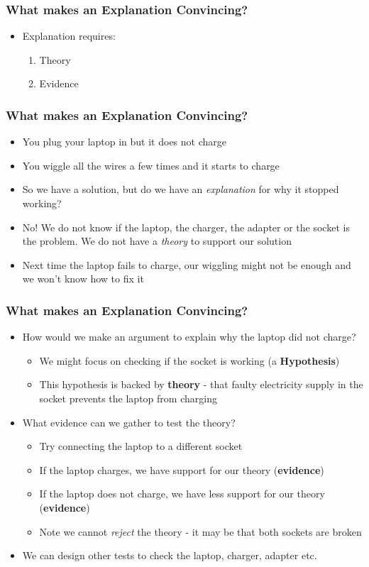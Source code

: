 \documentclass[xcolor=x11names,compress]{beamer}\usepackage[]{graphicx}\usepackage[]{color}
\renewcommand{\(}{\begin{columns}}
\renewcommand{\)}{\end{columns}}
\newcommand{\<}[1]{\begin{column}{#1}}
\renewcommand{\>}{\end{column}}
\begin{document}
\begin{frame}
\frametitle{What makes an Explanation Convincing?}
\begin{itemize}
\item  Explanation requires:
\begin{enumerate}
\item  Theory
\item  Evidence
\end{enumerate}
\end{itemize}
\end{frame}

\begin{frame}
\frametitle{What makes an Explanation Convincing?}
\begin{itemize}
\item  You plug your laptop in but it does not charge
\pause
\item You wiggle all the wires a few times and it starts to charge
\pause
\item So we have a solution, but do we have an \textit{explanation} for why it stopped working?
\pause
\item No! We do not know if the laptop, the charger, the adapter or the socket is the problem. We do not have a \textit{theory} to support our solution
\pause
\item Next time the laptop fails to charge, our wiggling might not be enough and we won't know how to fix it
\end{itemize}
\end{frame}

\begin{frame}
\frametitle{What makes an Explanation Convincing?}
\begin{itemize}
\item How would we make an argument to explain why the laptop did not charge?
\pause
\begin{itemize}
\item We might focus on checking if the socket is working (a \textbf{Hypothesis})
\pause
\item This hypothesis is backed by \textbf{theory} - that faulty electricity supply in the socket prevents the laptop from charging
\pause
\end{itemize}
\item What evidence can we gather to test the theory?
\pause
\begin{itemize}
\item Try connecting the laptop to a different socket
\pause
\item If the laptop charges, we have support for our theory (\textbf{evidence})
\pause
\item If the laptop does not charge, we have less support for our theory (\textbf{evidence})
\pause
\item Note we cannot \textit{reject} the theory - it may be that both sockets are broken
\pause
\end{itemize}
\item We can design other tests to check the laptop, charger, adapter etc. 
\end{itemize}
\end{frame}
\end{document}
